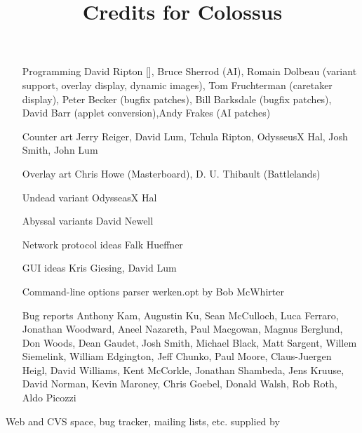 \documentclass{article}
\begin{document}

\title{Credits for Colossus}

\maketitle

\begin{itemize}

\item[Programming] David Ripton [], Bruce Sherrod (AI), Romain Dolbeau (variant support, overlay display, dynamic images), Tom Fruchterman (caretaker display), Peter Becker (bugfix patches), Bill Barksdale (bugfix patches), David Barr (applet conversion),Andy Frakes (AI patches)

\item[Counter art] Jerry Reiger, David Lum, Tchula Ripton, OdysseusX Hal, Josh Smith, John Lum

\item[Overlay art] Chris Howe (Masterboard), D. U. Thibault (Battlelands)

\item[Undead variant] OdysseasX Hal

\item[Abyssal variants] David Newell

\item[Network protocol ideas] Falk Hueffner

\item[GUI ideas] Kris Giesing, David Lum

\item[Command-line options parser] werken.opt by Bob McWhirter

\item[Bug reports] Anthony Kam, Augustin Ku, Sean McCulloch, Luca Ferraro, Jonathan Woodward, Aneel Nazareth, Paul Macgowan, Magnus Berglund, Don Woods, Dean Gaudet, Josh Smith, Michael Black, Matt Sargent, Willem Siemelink, William Edgington, Jeff Chunko, Paul Moore, Claus-Juergen Heigl, David Williams, Kent McCorkle, Jonathan Shambeda, Jens Kruuse, David Norman, Kevin Maroney, Chris Goebel, Donald Walsh, Rob Roth, Aldo Picozzi


\end{itemize}

Web and CVS space, bug tracker, mailing lists, etc. supplied by 
\end{document}

